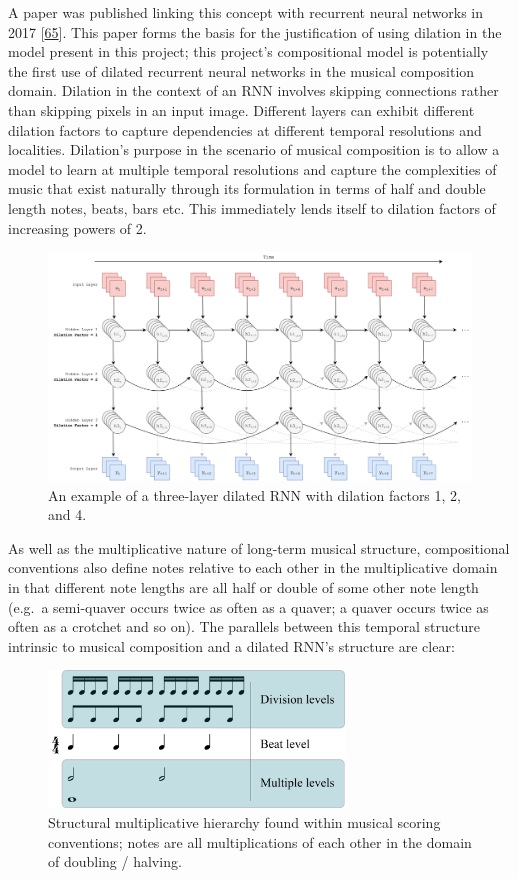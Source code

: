 \documentclass[12pt,]{article}
\begin{document}
A paper was published linking this concept with recurrent neural
networks in 2017 {[}\protect\hyperlink{ref-chang2017dilated}{65}{]}.
This paper forms the basis for the justification of using dilation in
the model present in this project; this project's compositional model is
potentially the first use of dilated recurrent neural networks in the
musical composition domain. Dilation in the context of an RNN involves
skipping connections rather than skipping pixels in an input image.
Different layers can exhibit different dilation factors to capture
dependencies at different temporal resolutions and localities.
Dilation's purpose in the scenario of musical composition is to allow a
model to learn at multiple temporal resolutions and capture the
complexities of music that exist naturally through its formulation in
terms of half and double length notes, beats, bars etc. This immediately
lends itself to dilation factors of increasing powers of 2.

\begin{figure}
\centering
\includegraphics[width=1\textwidth,height=\textheight]{Images/dilatedrnn.png}
\caption{An example of a three-layer dilated RNN with dilation factors
1, 2, and 4.}
\end{figure}

As well as the multiplicative nature of long-term musical structure,
compositional conventions also define notes relative to each other in
the multiplicative domain in that different note lengths are all half or
double of some other note length (e.g.~a semi-quaver occurs twice as
often as a quaver; a quaver occurs twice as often as a crotchet and so
on). The parallels between this temporal structure intrinsic to musical
composition and a dilated RNN's structure are clear:

\begin{figure}
\centering
\includegraphics[width=0.7\textwidth,height=\textheight]{Images/Metric_levels.png}
\caption{Structural multiplicative hierarchy found within musical
scoring conventions; notes are all multiplications of each other in the
domain of doubling / halving.}
\end{figure}
\end{document}
